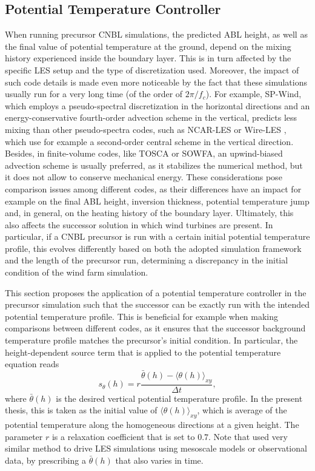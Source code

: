 \subsection{Potential Temperature Controller}
\label{subsec:potentialTemperatureController}
When running precursor CNBL simulations, the predicted ABL height, as well as the final value of potential temperature at the ground, depend on the mixing history experienced inside the boundary layer. This is in turn affected by the specific LES setup and the type of discretization used.  Moreover, the impact of such code details is made even more noticeable by the fact that these simulations usually run for a very long time (of the order of $2\pi/f_c$). For example, SP-Wind, which employs a pseudo-spectral discretization in the horizontal directions and an energy-conservative fourth-order advection scheme in the vertical, predicts less mixing than other pseudo-spectra codes, such as NCAR-LES \citep{PedersenEtAl2014} or Wire-LES \citep{AbkarPorteAgel2013}, which use for example a second-order central scheme in the vertical direction. Besides, in finite-volume codes, like TOSCA or SOWFA, an upwind-biased advection scheme is usually preferred, as it stabilizes the numerical method, but it does not allow to conserve mechanical energy. These considerations pose comparison issues among different codes, as their differences have an impact for example on the final ABL height, inversion thickness, potential temperature jump and, in general, on the heating history of the boundary layer. Ultimately, this also affects the successor solution in which wind turbines are present. In particular, if a CNBL precursor is run with a certain initial potential temperature profile, this evolves differently based on both the adopted simulation framework and the length of the precursor run, determining a discrepancy in the initial condition of the wind farm simulation. 

This section proposes the application of a potential temperature controller in the precursor simulation such that the successor can be exactly run with the intended potential temperature profile. This is beneficial for example when making comparisons between different codes, as it ensures that the successor background temperature profile matches the precursor's initial condition. In particular, the height-dependent source term that is applied to the potential temperature equation reads 
\begin{equation}
	s_{\theta}(h) = r\frac{\bar{\theta}(h)-\langle\theta(h)\rangle_{xy}}{\Delta t}, \label{eq:temperatureControl}
\end{equation}
where $\bar{\theta}(h)$ is the desired vertical potential temperature profile. In the present thesis, this is taken as the initial value of $\langle\theta(h)\rangle_{xy}$, which is average of the potential temperature along the homogeneous directions at a given height. The parameter $r$ is a relaxation coefficient that is set to $0.7$. Note that \cite{AllaertsEtAl2020,AllaertsEtAl2023} used very similar method to drive LES simulations using mesoscale models or observational data, by prescribing a $\bar{\theta}(h)$ that also varies in time. 

